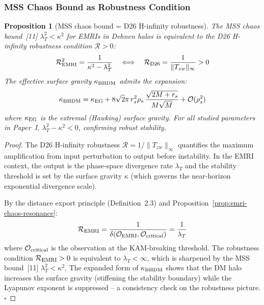 \documentclass[
]{article}
\newtheorem{proposition}[theorem]{Proposition}
\begin{document}
\subsubsection{MSS Chaos Bound as Robustness Condition}\label{subsec:mss-robustness}

\begin{proposition}[MSS chaos bound = D26 H-infinity robustness]\label{prop:mss-robustness}
The MSS chaos bound~[11] $\lambda_T^2 < \kappa^2$ for EMRIs in Dehnen halos is equivalent to the D26 H-infinity robustness condition $\mathcal{R} > 0$:
\begin{equation}
\mathcal{R}_{\rm EMRI}^2 = \frac{1}{\kappa^2 - \lambda_T^2} \quad \Longleftrightarrow \quad \mathcal{R}_{\rm D26} = \frac{1}{\|T_{zw}\|_\infty} > 0
\end{equation}
The effective surface gravity $\kappa_{\rm BHDM}$ admits the expansion:
\begin{equation}
\kappa_{\rm BHDM} = \kappa_{\rm EG} + 8\sqrt{2}\pi\,r_s^2\rho_s\,\frac{\sqrt{2M+r_s}}{M\sqrt{M}} + \mathcal{O}(\rho_s^2)
\end{equation}
where $\kappa_{\rm EG}$ is the extremal (Hawking) surface gravity. For all studied parameters in Paper~I, $\lambda_T^2 - \kappa^2 < 0$, confirming robust stability.
\end{proposition}

\begin{proof}
The D26 H-infinity robustness $\mathcal{R} = 1/\|T_{zw}\|_\infty$ quantifies the maximum amplification from input perturbation to output before instability. In the EMRI context, the output is the phase-space divergence rate $\lambda_T$ and the stability threshold is set by the surface gravity $\kappa$ (which governs the near-horizon exponential divergence scale).

By the distance export principle (Definition~2.3) and Proposition~\ref{prop:emri-chaos-resonance}:
\begin{equation}
\mathcal{R}_{\rm EMRI} = \frac{1}{\delta(\mathcal{O}_{\rm EMRI}, \mathcal{O}_{\rm critical})} = \frac{1}{\lambda_T}
\end{equation}
where $\mathcal{O}_{\rm critical}$ is the observation at the KAM-breaking threshold. The robustness condition $\mathcal{R}_{\rm EMRI} > 0$ is equivalent to $\lambda_T < \infty$, which is sharpened by the MSS bound~[11] $\lambda_T^2 < \kappa^2$. The expanded form of $\kappa_{\rm BHDM}$ shows that the DM halo increases the surface gravity (stiffening the stability boundary) while the Lyapunov exponent is suppressed -- a consistency check on the robustness picture. $\square$
\end{proof}
\end{document}
